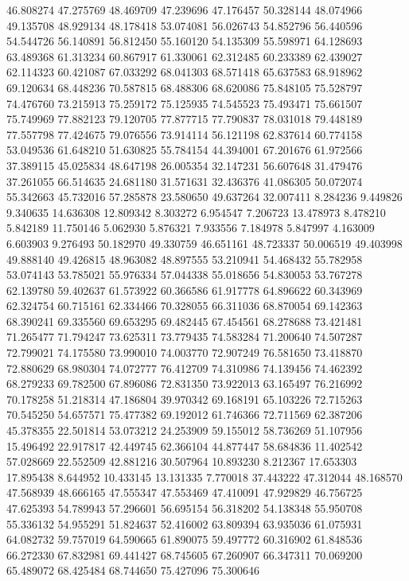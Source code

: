 46.808274
47.275769
48.469709
47.239696
47.176457
50.328144
48.074966
49.135708
48.929134
48.178418
53.074081
56.026743
54.852796
56.440596
54.544726
56.140891
56.812450
55.160120
54.135309
55.598971
64.128693
63.489368
61.313234
60.867917
61.330061
62.312485
60.233389
62.439027
62.114323
60.421087
67.033292
68.041303
68.571418
65.637583
68.918962
69.120634
68.448236
70.587815
68.488306
68.620086
75.848105
75.528797
74.476760
73.215913
75.259172
75.125935
74.545523
75.493471
75.661507
75.749969
77.882123
79.120705
77.877715
77.790837
78.031018
79.448189
77.557798
77.424675
79.076556
73.914114
56.121198
62.837614
60.774158
53.049536
61.648210
51.630825
55.784154
44.394001
67.201676
61.972566
37.389115
45.025834
48.647198
26.005354
32.147231
56.607648
31.479476
37.261055
66.514635
24.681180
31.571631
32.436376
41.086305
50.072074
55.342663
45.732016
57.285878
23.580650
49.637264
32.007411
8.284236
9.449826
9.340635
14.636308
12.809342
8.303272
6.954547
7.206723
13.478973
8.478210
5.842189
11.750146
5.062930
5.876321
7.933556
7.184978
5.847997
4.163009
6.603903
9.276493
50.182970
49.330759
46.651161
48.723337
50.006519
49.403998
49.888140
49.426815
48.963082
48.897555
53.210941
54.468432
55.782958
53.074143
53.785021
55.976334
57.044338
55.018656
54.830053
53.767278
62.139780
59.402637
61.573922
60.366586
61.917778
64.896622
60.343969
62.324754
60.715161
62.334466
70.328055
66.311036
68.870054
69.142363
68.390241
69.335560
69.653295
69.482445
67.454561
68.278688
73.421481
71.265477
71.794247
73.625311
73.779435
74.583284
71.200640
74.507287
72.799021
74.175580
73.990010
74.003770
72.907249
76.581650
73.418870
72.880629
68.980304
74.072777
76.412709
74.310986
74.139456
74.462392
68.279233
69.782500
67.896086
72.831350
73.922013
63.165497
76.216992
70.178258
51.218314
47.186804
39.970342
69.168191
65.103226
72.715263
70.545250
54.657571
75.477382
69.192012
61.746366
72.711569
62.387206
45.378355
22.501814
53.073212
24.253909
59.155012
58.736269
51.107956
15.496492
22.917817
42.449745
62.366104
44.877447
58.684836
11.402542
57.028669
22.552509
42.881216
30.507964
10.893230
8.212367
17.653303
17.895438
8.644952
10.433145
13.131335
7.770018
37.443222
47.312044
48.168570
47.568939
48.666165
47.555347
47.553469
47.410091
47.929829
46.756725
47.625393
54.789943
57.296601
56.695154
56.318202
54.138348
55.950708
55.336132
54.955291
51.824637
52.416002
63.809394
63.935036
61.075931
64.082732
59.757019
64.590665
61.890075
59.497772
60.316902
61.848536
66.272330
67.832981
69.441427
68.745605
67.260907
66.347311
70.069200
65.489072
68.425484
68.744650
75.427096
75.300646
